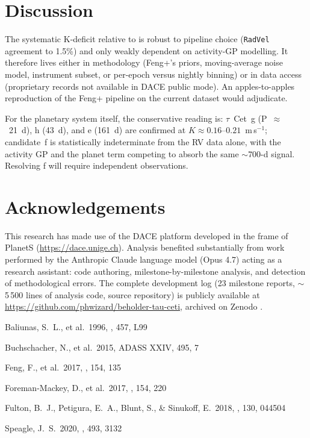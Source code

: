 \documentclass[RNAAS]{aastex701}
\begin{document}
\section{Discussion}

The systematic K-deficit relative to \citet{Feng2017} is robust to pipeline choice (\texttt{RadVel} agreement to 1.5\%) and only weakly dependent on activity-GP modelling. It therefore lives either in methodology (Feng+'s priors, moving-average noise model, instrument subset, or per-epoch versus nightly binning) or in data access (proprietary records not available in DACE public mode). An apples-to-apples reproduction of the Feng+ pipeline on the current dataset would adjudicate.

For the planetary system itself, the conservative reading is: $\tau$~Cet~g (P~$\approx$~21~d), h (43~d), and e (161~d) are confirmed at $K \approx 0.16$--$0.21$~m\,s$^{-1}$; candidate~f is statistically indeterminate from the RV data alone, with the activity GP and the planet term competing to absorb the same $\sim$700-d signal. Resolving f will require independent observations.

\section*{Acknowledgements}

This research has made use of the DACE platform developed in the frame of PlanetS (\url{https://dace.unige.ch}). Analysis benefited substantially from work performed by the Anthropic Claude language model (Opus 4.7) acting as a research assistant: code authoring, milestone-by-milestone analysis, and detection of methodological errors. The complete development log (23 milestone reports, $\sim$5\,500 lines of analysis code, source repository) is publicly available at \url{https://github.com/phwizard/beholder-tau-ceti}, archived on Zenodo .




\begin{thebibliography}{}

 Baliunas, S.~L., et al.\ 1996, \apj, 457, L99

 Buchschacher, N., et al.\ 2015, ADASS XXIV, 495, 7

 Feng, F., et al.\ 2017, \aj, 154, 135

 Foreman-Mackey, D., et al.\ 2017, \aj, 154, 220

 Fulton, B.~J., Petigura, E.~A., Blunt, S., \& Sinukoff, E.\ 2018, \pasp, 130, 044504

 Speagle, J.~S.\ 2020, \mnras, 493, 3132

\end{thebibliography}
\end{document}
